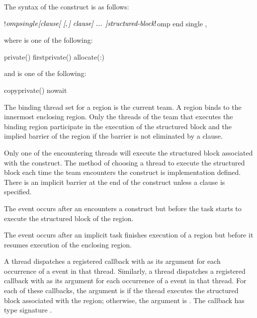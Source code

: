 \begin{fortranspecific}
The syntax of the  construct is as follows:

\begin{ompfPragma}
!$omp single \plc{[clause[ [},\plc{] clause] ... ]}
   \plc{structured-block}
!$omp end single \plc{[end_clause[ [},\plc{] end_clause] ... ]}
\end{ompfPragma}

where  is one of the following:

\begin{indentedcodelist}
private()
firstprivate()
allocate(\plc{[allocator }:\plc{] list})
\end{indentedcodelist}

and  is one of the following:

\begin{indentedcodelist}
copyprivate()
nowait
\end{indentedcodelist}
\end{fortranspecific}

\binding
The binding thread set for a  region is the current team. 
A  region binds to the innermost enclosing  
region. Only the threads of the team that executes the binding  
region participate in the execution of the structured block and the implied 
barrier of the  region if the barrier is not eliminated by a
 clause.

\descr
Only one of the encountering threads will execute the structured block 
associated with the  construct. The method of choosing a thread 
to execute the structured block each time the team encounters the construct
is implementation defined. There is an implicit barrier at the end of the 
 construct unless a  clause is specified.

\events

The  event occurs after an  encounters a
 construct but before the task starts to execute the structured
block of the  region.

The  event occurs after an implicit task finishes execution of 
a  region but before it resumes execution of the enclosing region.

\tools

A thread dispatches a registered  callback with 
 as its  argument for each 
occurrence of a  event  in that thread. Similarly, a 
thread dispatches a registered  callback  with 
 as its  argument for each occurrence 
of a  event in that thread. For each of these callbacks,
the  argument is  if the thread
executes the structured block associated with the  region;
otherwise, the  argument is  .
The callback has type signature .


